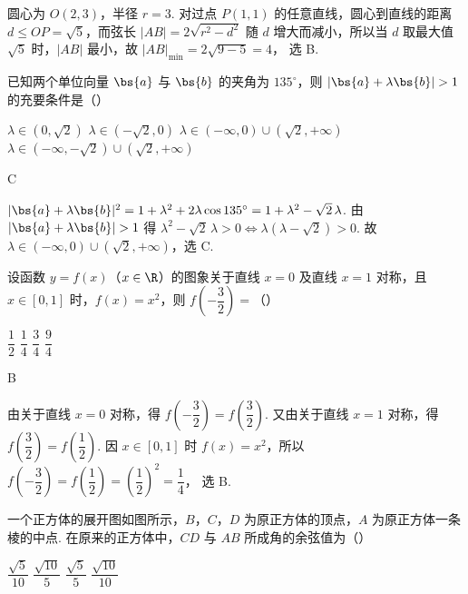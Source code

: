 \begin{solution}
圆心为 \(O(2,3)\)，半径 \(r=3\). 对过点 \(P(1,1)\) 的任意直线，圆心到直线的距离 \(d\le OP=\sqrt5\)，而弦长
\(|AB|=2\sqrt{r^2-d^2}\)
随 \(d\) 增大而减小，所以当 \(d\) 取最大值 \(\sqrt5\) 时，\(|AB|\) 最小，故
\(|AB|_{\min}=2\sqrt{9-5}=4\)，
选 B.
\end{solution}

\begin{problem}
已知两个单位向量 \(\bs{a}\) 与 \(\bs{b}\) 的夹角为 \(135^\circ\)，则 \(|\bs{a}+\lambda\bs{b}|>1\) 的充要条件是（\quad）

\choices
    {\(\lambda\in(0,\sqrt2)\)}
    {\(\lambda\in(-\sqrt2,0)\)}
    {\(\lambda\in(-\infty,0)\cup(\sqrt2,+\infty)\)}
    {\(\lambda\in(-\infty,-\sqrt2)\cup(\sqrt2,+\infty)\)}
\end{problem}

\begin{answer}
C
\end{answer}

\begin{solution}
\(|\bs{a}+\lambda\bs{b}|^2=1+\lambda^2+2\lambda\cos135^\circ=1+\lambda^2-\sqrt2\,\lambda\).
由 \(|\bs{a}+\lambda\bs{b}|>1\) 得 \(\lambda^2-\sqrt2\,\lambda>0\iff \lambda(\lambda-\sqrt2)>0\).
故 \(\lambda\in(-\infty,0)\cup(\sqrt2,+\infty)\)，选 C.
\end{solution}

\begin{problem}
设函数 \(y=f(x)\)（\(x\in \R\)）的图象关于直线 \(x=0\) 及直线 \(x=1\) 对称，且 \(x\in[0,1]\) 时，\(f(x)=x^2\)，则 \(f\!\left(-\dfrac32\right)=\)（\quad）

\choices
    {\(\dfrac12\)}
    {\(\dfrac14\)}
    {\(\dfrac34\)}
    {\(\dfrac94\)}
\end{problem}

\begin{answer}
B
\end{answer}

\begin{solution}
由关于直线 \(x=0\) 对称，得 \(f\!\left(-\dfrac32\right)=f\!\left(\dfrac32\right)\). 又由关于直线 \(x=1\) 对称，得 \(f\!\left(\dfrac32\right)=f\!\left(\dfrac12\right)\). 因 \(x\in[0,1]\) 时 \(f(x)=x^2\)，所以 \(f\!\left(-\dfrac32\right)=f\!\left(\dfrac12\right)=\left(\dfrac12\right)^2=\dfrac14\)，
选 B.
\end{solution}

\begin{problem}
一个正方体的展开图如图所示，\(B\)，\(C\)，\(D\) 为原正方体的顶点，\(A\) 为原正方体一条棱的中点. 在原来的正方体中，\(CD\) 与 \(AB\) 所成角的余弦值为（\quad）


\choices
    {\(\dfrac{\sqrt5}{10}\)}
    {\(\dfrac{\sqrt{10}}{5}\)}
    {\(\dfrac{\sqrt5}{5}\)}
    {\(\dfrac{\sqrt{10}}{10}\)}
\end{problem}

